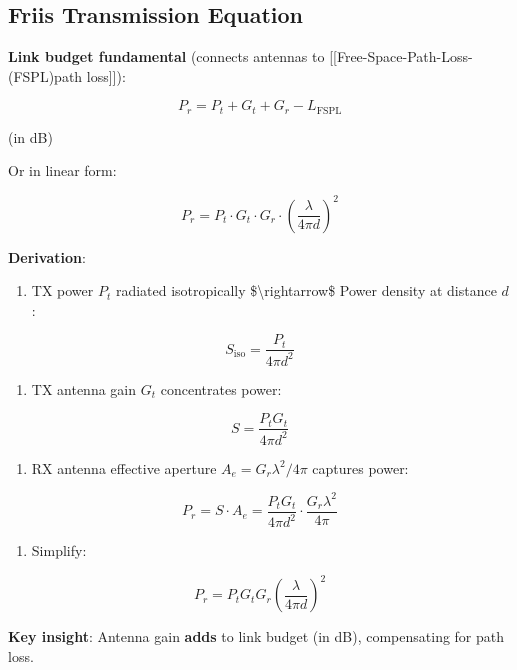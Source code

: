\subsection{Friis Transmission
Equation}\label{friis-transmission-equation}

\textbf{Link budget fundamental} (connects antennas to
{[}{[}Free-Space-Path-Loss-(FSPL)\textbar path loss{]}{]}):

\[
P_r = P_t + G_t + G_r - L_{\text{FSPL}}
\]

(in dB)

Or in linear form:

\[
P_r = P_t \cdot G_t \cdot G_r \cdot \left(\frac{\lambda}{4\pi d}\right)^2
\]

\textbf{Derivation}:

\begin{enumerate}
\def\labelenumi{\arabic{enumi}.}
\tightlist
\item
  TX power \(P_t\) radiated isotropically \$\textbackslash rightarrow\$
  Power density at distance \(d\):
\end{enumerate}

\[
S_{\text{iso}} = \frac{P_t}{4\pi d^2}
\]

\begin{enumerate}
\def\labelenumi{\arabic{enumi}.}
\setcounter{enumi}{1}
\tightlist
\item
  TX antenna gain \(G_t\) concentrates power:
\end{enumerate}

\[
S = \frac{P_t G_t}{4\pi d^2}
\]

\begin{enumerate}
\def\labelenumi{\arabic{enumi}.}
\setcounter{enumi}{2}
\tightlist
\item
  RX antenna effective aperture \(A_e = G_r \lambda^2 / 4\pi\) captures
  power:
\end{enumerate}

\[
P_r = S \cdot A_e = \frac{P_t G_t}{4\pi d^2} \cdot \frac{G_r \lambda^2}{4\pi}
\]

\begin{enumerate}
\def\labelenumi{\arabic{enumi}.}
\setcounter{enumi}{3}
\tightlist
\item
  Simplify:
\end{enumerate}

\[
P_r = P_t G_t G_r \left(\frac{\lambda}{4\pi d}\right)^2
\]

\textbf{Key insight}: Antenna gain \textbf{adds} to link budget (in dB),
compensating for path loss.

